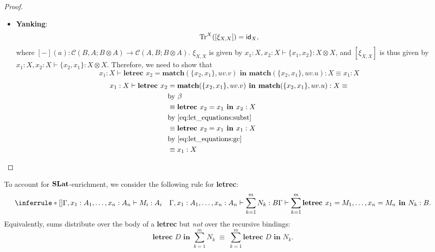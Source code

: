 \begin{example}
\begin{proof}
\begin{itemize}
Therefore, by $\eta$-equation, we have that
\[
\textbf{match}(f(c,x), \alpha\beta.\{g(a), \alpha\}) \equiv \{g(a), \textbf{match}(f(c,x), \alpha\beta.\alpha)\},
\]
and can write the left-hand side as
\begin{align*}
\textbf{letrec } x &= \textbf{match}(f(c,x), \alpha\beta.\beta) \textbf{ in }\\
&\{g(a), \textbf{match}(f(c,x), \alpha\beta.\alpha)\}\\
&\text{by \cref{eq:let_equations:float-tensor-R}}\\
&\equiv \{g(a), \textbf{letrec } x = \textbf{match}(f(c,x), \alpha\beta.\beta) \textbf{ in } \textbf{match}(f(c,x), \alpha\beta.\alpha)\} 
\end{align*}
Up to $\alpha$-equivalence, this is exactly the right-hand side.
\item \textbf{Yanking}: 
\[
\text{Tr}^{X}([\xi_{X,X}]) = \textsf{id}_{X},
\]
where $[-](a) : \mathcal{C}(B,A;B \otimes A) \to \mathcal{C}(A,B;B \otimes A)$.
$\xi_{X,X}$ is given by $x_1 : X, x_2 : X \vdash \{x_1, x_2\} : X \otimes X$, and $[\xi_{X,X}]$ is thus given by $x_1 : X, x_2 : X \vdash \{x_2, x_1\} : X \otimes X$.
Therefore, we need to show that
\[
x_1 : X \vdash \textbf{letrec } x_2 = \textbf{match}(\{x_2,x_1\}, uv.v) \textbf{ in } \textbf{match}(\{x_2,x_1\}, uv.u) : X \equiv x_1 : X
\]
\begin{align*}
x_1 : X \vdash \textbf{letrec } x_2 &= \textbf{match}(\{x_2,x_1\}, uv.v) \textbf{ in } \textbf{match}(\{x_2,x_1\}, uv.u) : X \equiv\\
&\text{by $\beta$}\\
&\equiv \textbf{letrec } x_2 = x_1 \textbf{ in } x_2 : X\\
&\text{by \cref{eq:let_equations:subst}}\\
&\equiv \textbf{letrec } x_2 = x_1 \textbf{ in } x_1 : X\\
&\text{by \cref{eq:let_equations:gc}}\\ 
&\equiv x_1 : X
\end{align*}
\end{itemize}
\end{proof}

To account for $\mathbf{SLat}$-enrichment, we consider the following rule for \textbf{letrec}:
\[
\inferrule*[]{\Gamma, x_1 : A_1, \ldots, x_n : A_n \vdash M_i : A_i \quad \Gamma, x_1 : A_1, \ldots, x_n : A_n \vdash \sum_{k=1}^{m}N_{k} : B}
{\Gamma \vdash \sum_{k=1}^{m}\textbf{letrec } x_1 = M_1, \ldots, x_n = M_n \textbf{ in } N_k : B}.
\]
Equivalently, sums distribute over the body of a \textbf{letrec} but \emph{not} over the recursive bindings:
\[
\textbf{letrec } D \textbf{ in } \sum_{k=1}^{m} N_k \;\equiv\; \sum_{k=1}^{m} \textbf{letrec } D \textbf{ in } N_k.
\]


\end{example}
